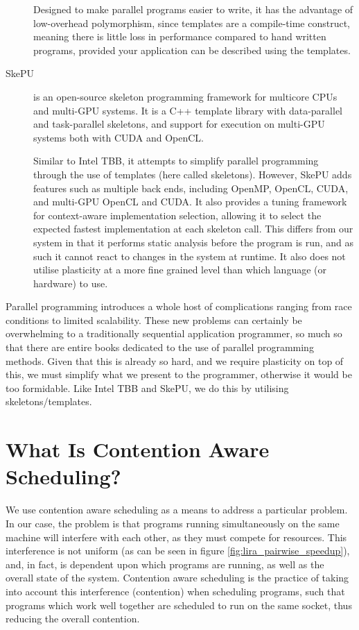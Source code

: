 \begin{description}
Designed to make parallel programs easier to write, it has the advantage of low-overhead polymorphism, since templates are a compile-time construct, meaning there is little loss in performance compared to hand written programs, provided your application can be described using the templates.

\item[SkePU] is an open-source skeleton programming framework for multicore CPUs and multi-GPU systems. It is a C++ template library with data-parallel and task-parallel skeletons, and support for execution on multi-GPU systems both with CUDA and OpenCL.

Similar to Intel TBB, it attempts to simplify parallel programming through the use of templates (here called skeletons). However, SkePU adds features such as multiple back ends, including OpenMP, OpenCL, CUDA, and multi-GPU OpenCL and CUDA. It also provides a tuning framework for context-aware implementation selection, allowing it to select the expected fastest implementation at each skeleton call. This differs from our system in that it performs static analysis before the program is run, and as such it cannot react to changes in the system at runtime. It also does not utilise plasticity at a more fine grained level than which language (or hardware) to use.
\end{description}



Parallel programming introduces a whole host of complications ranging from race conditions to limited scalability. These new problems can certainly be overwhelming to a traditionally sequential application programmer, so much so that there are entire books dedicated to the use of parallel programming methods. Given that this is already so hard, and we require plasticity on top of this, we must simplify what we present to the programmer, otherwise it would be too formidable. Like Intel TBB and SkePU, we do this by utilising skeletons/templates.



\section{What Is Contention Aware Scheduling?}
\label{section:background:what_is_contention_aware_scheduling}

We use contention aware scheduling as a means to address a particular problem. In our case, the problem is that programs running simultaneously on the same machine will interfere with each other, as they must compete for resources. This interference is not uniform (as can be seen in figure \ref{fig:lira_pairwise_speedup}), and, in fact, is dependent upon which programs are running, as well as the overall state of the system. Contention aware scheduling is the practice of taking into account this interference (contention) when scheduling programs, such that programs which work well together are scheduled to run on the same socket, thus reducing the overall contention.

